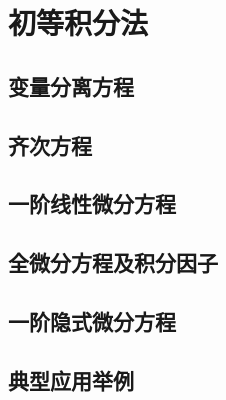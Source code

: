 \documentclass[oneside]{book}
\theoremstyle{definition}
\theoremstyle{definition}
\theoremstyle{cth}
\theoremstyle{cnthm}
\begin{document}
	
	\chapter{初等积分法}
	\section{变量分离方程}
	\section{齐次方程}
	\section{一阶线性微分方程}
	\section{全微分方程及积分因子}
	\section{一阶隐式微分方程}
	\section{典型应用举例}
	
	
	
	
	
	
	
	
	
	
	
	
	
	
	
	
	
	
	
	
	
	
	
	
	
	
	
	
\end{document}

